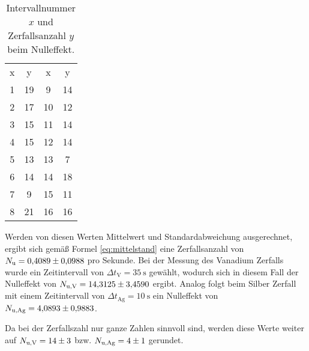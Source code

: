 \begin{table}[H]
    \centering
    \caption[short]{Intervallnummer $x$ und Zerfallsanzahl $y$ beim Nulleffekt.}
    \label{tab:nulleffekt}
    \begin{tabular}{S S S S}
        \toprule
        {x} & {y} & {x} & {y} \\
        \cmidrule(lr){1-2}\cmidrule(lr){3-4}
        1 & 19 &  9 & 14 \\
        2 & 17 & 10 & 12 \\
        3 & 15 & 11 & 14 \\
        4 & 15 & 12 & 14 \\
        5 & 13 & 13 &  7 \\
        6 & 14 & 14 & 18 \\
        7 &  9 & 15 & 11 \\
        8 & 21 & 16 & 16 \\
        \bottomrule
    \end{tabular}
\end{table}

\noindent
Werden von diesen Werten Mittelwert und Standardabweichung ausgerechnet, ergibt sich gemäß Formel \eqref{eq:mittelstand} 
eine Zerfallsanzahl von $N_\text{u} = \num[]{0.4089 +- 0.0988}$ pro Sekunde.
Bei der Messung des Vanadium Zerfalls wurde ein Zeitintervall von $\Delta t_\text{V} = \qty[]{35}{\second}$ gewählt, 
wodurch sich in diesem Fall der Nulleffekt von $N_\text{u,V} = \num[]{14.3125 +- 3.4590}$ ergibt.
Analog folgt beim Silber Zerfall mit einem Zeitintervall von $\Delta t_\text{Ag} = \qty[]{10}{\second}$ ein Nulleffekt von 
$N_\text{u,Ag} = \num[]{4.0893 +- 0.9883}$.

\noindent
Da bei der Zerfallszahl nur ganze Zahlen sinnvoll sind, werden diese Werte weiter auf $N_\text{u,V} = \num[]{14 +- 3}$ bzw.
$N_\text{u,Ag} = \num[]{4 +- 1}$ gerundet.


